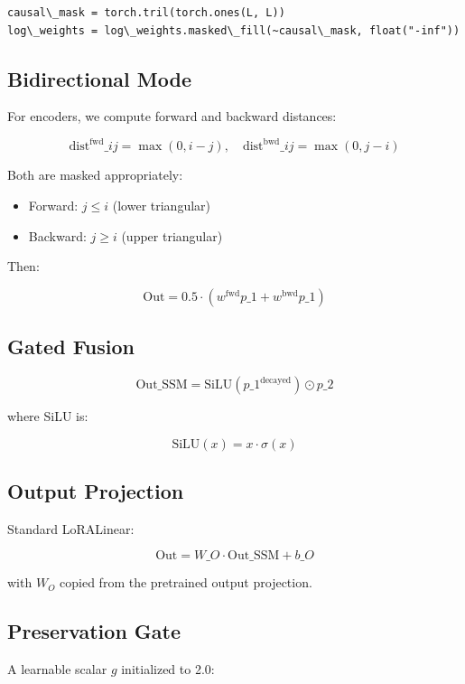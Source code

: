 \begin{lstlisting}
causal\_mask = torch.tril(torch.ones(L, L))
log\_weights = log\_weights.masked\_fill(~causal\_mask, float("-inf"))
\end{lstlisting}

\subsection{Bidirectional Mode}

For encoders, we compute forward and backward distances:

\[
\text{dist}^\text{fwd}\_{ij} = \max(0, i - j), \quad
\text{dist}^\text{bwd}\_{ij} = \max(0, j - i)
\tag{4.8}
\]

Both are masked appropriately:

\begin{itemize}
\item Forward: $j \leq i$ (lower triangular)
\item Backward: $j \geq i$ (upper triangular)

\end{itemize}
Then:

\[
\text{Out} = 0.5 \cdot (w^\text{fwd} p\_1 + w^\text{bwd} p\_1)
\tag{4.9}
\]

\subsection{Gated Fusion}

\[
\text{Out}\_\text{SSM} = \text{SiLU}(p\_1^\text{decayed}) \odot p\_2
\tag{4.10}
\]

where SiLU is:

\[
\text{SiLU}(x) = x \cdot \sigma(x)
\tag{4.11}
\]

\subsection{Output Projection}

Standard LoRALinear:

\[
\text{Out} = W\_O \cdot \text{Out}\_\text{SSM} + b\_O
\tag{4.12}
\]

with $W_O$ copied from the pretrained output projection.

\subsection{Preservation Gate}

A learnable scalar $g$ initialized to 2.0:

